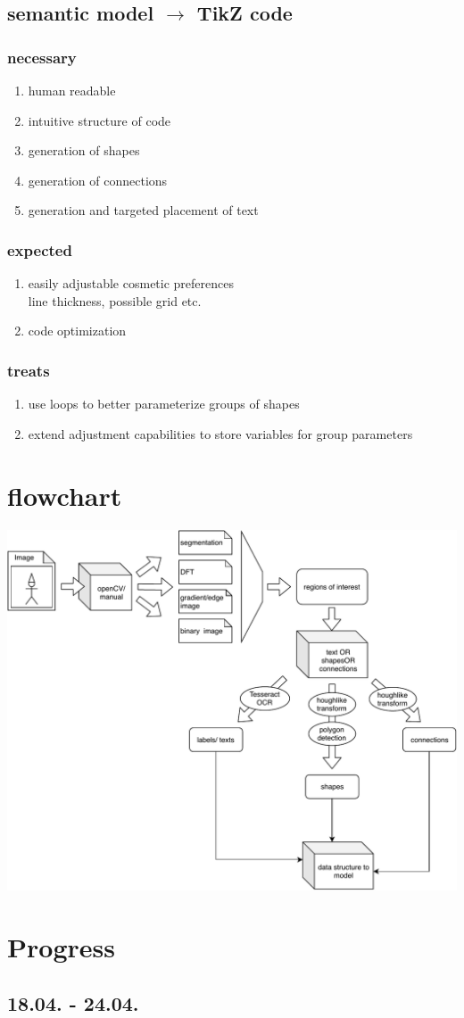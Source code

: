 \documentclass{article}
\begin{document}
\subsection*{semantic model $\rightarrow$ TikZ code}
\subsubsection*{necessary}
\begin{enumerate}
    \item human readable
    \item intuitive structure of code
    \item generation of shapes
    \item generation of connections
    \item generation and targeted placement of text
\end{enumerate}
\subsubsection*{expected}
\begin{enumerate}
    \item easily adjustable cosmetic preferences \\line thickness, possible grid etc.
    \item code optimization
\end{enumerate}
\subsubsection*{treats}
\begin{enumerate}
    \item use loops to better parameterize groups of shapes
    \item extend adjustment capabilities to store variables for group parameters
\end{enumerate}
\section{flowchart}
\includegraphics[width=\textwidth]{./img/FlowchartTikZ.pdf}
\section{Progress}
\subsection{18.04. - 24.04.}
\end{document}
